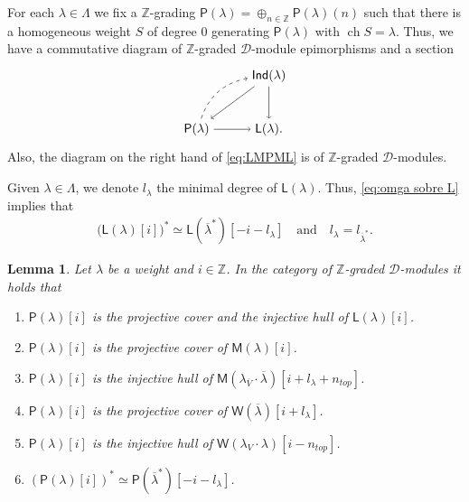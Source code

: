 \documentclass[reqno]{amsart}
\newcommand{\oV}{\overline{V}}
\renewcommand{\_}[1]{_{\left( #1 \right)}}
\renewcommand{\^}[1]{^{\left( #1 \right)}}
\newcommand\fInd{\mathsf{Ind}}
\newcommand\fL{\mathsf{L}}
\newcommand\fM{\mathsf{M}}
\newcommand\fP{\mathsf{P}}
\newcommand\fW{\mathsf{W}}
\newcommand{\Z}{{\mathbb Z}}
\newcommand{\D}{\mathcal{D}}
\newcommand{\ch}{\operatorname{ch}}
\theoremstyle{plain}
\newtheorem{lema}{Lemma}[section]
\theoremstyle{definition}
\theoremstyle{remark}
\begin{document}
For each $\lambda\in\Lambda$ we fix a $\Z$-grading $\fP(\lambda)=\oplus_{n\in\Z}\fP(\lambda)(n)$ such that there is a homogeneous weight  $S$ of degree $0$ generating $\fP(\lambda)$ with $\ch S=\lambda$. Thus, we have a commutative diagram of $\Z$-graded $\D$-module epimorphisms and a section
\begin{align}
\begin{tikzpicture}[baseline=(current bounding box.center)]
\node (P) at (-2,0) {$\fP(\lambda)$};
\node (L) at (0,0) {$\fL(\lambda)$.};
\node (Ind) at (0,1.5) {$\fInd(\lambda)$};
\draw (P) edge[->] (L); %
\draw (P) edge[bend left=30,dashed, ->] (Ind);
\draw (Ind) edge[->]  (L);
\draw (Ind) edge[->]  (P);
\end{tikzpicture}
\end{align} 
Also, the diagram on the right hand of \eqref{eq:LMPML} is of $\Z$-graded $\D$-modules.

Given $\lambda\in\Lambda$, we denote $l_\lambda$ the minimal degree of $\fL(\lambda)$. Thus, \eqref{eq:omga sobre L} implies that
\begin{align}\label{eq:dual gr Llambda}
\bigl(\fL(\lambda)[i]\bigr)^*\simeq\fL\left(\overline{\lambda}^*\right)[-i-l_\lambda]\quad\mbox{and}\quad l_\lambda=l_{\overline{\lambda}^*}.
\end{align}

\begin{lema}\label{le:about P gr}
Let $\lambda$ be a weight and $i\in\Z$. In the category of $\Z$-graded $\D$-modules it holds that
\begin{enumerate}[label=(\roman*)]
\item\label{item:P es proj cov inj hull gr} $\fP(\lambda)[i]$ is the projective cover and the injective hull of $\fL(\lambda)[i]$.
\smallskip
\item\label{item:P pc of verma gr} $\fP(\lambda)[i]$ is the projective cover of $\fM(\lambda) [i]$.
\smallskip
\item\label{item:P ih of verma gr} $\fP(\lambda)[i]$ is the injective hull of $\fM\left(\lambda_{\oV}\cdot\overline{\lambda}\right)[i+l_\lambda+n_{top}]$.
\smallskip
\item\label{item:P pc of coverma gr} $\fP(\lambda)[i]$ is the projective cover of $\fW(\overline{\lambda})[i+l_\lambda]$.
\smallskip
\item\label{item:P ih of coverma gr} $\fP(\lambda)[i]$ is the injective hull of $\fW\left(\lambda_V\cdot\lambda\right)[i-n_{top}]$.
\smallskip
\item\label{item:P dual gr} $\left(\fP(\lambda)[i]\right)^*\simeq\fP\left(\overline{\lambda}^*\right)[-i-l_\lambda]$.
\end{enumerate}
\end{lema}
\end{document}
